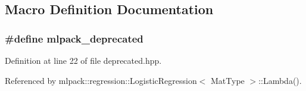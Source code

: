 \subsection{Macro Definition Documentation}
\subsubsection[{mlpack\+\_\+deprecated}]{\setlength{\rightskip}{0pt plus 5cm}\#define mlpack\+\_\+deprecated}\label{deprecated_8hpp_a3d7d5df477a8805980e43e423e18a525}


Definition at line 22 of file deprecated.\+hpp.



Referenced by mlpack\+::regression\+::\+Logistic\+Regression$<$ Mat\+Type $>$\+::\+Lambda().

